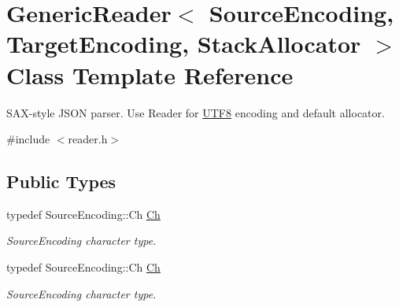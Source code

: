 \hypertarget{classGenericReader}{}\section{Generic\+Reader$<$ Source\+Encoding, Target\+Encoding, Stack\+Allocator $>$ Class Template Reference}
\label{classGenericReader}


S\+A\+X-\/style J\+S\+ON parser. Use Reader for \hyperlink{structUTF8}{U\+T\+F8} encoding and default allocator.  




{\ttfamily \#include $<$reader.\+h$>$}

\subsection*{Public Types}
\begin{DoxyCompactItemize}
\item 
\mbox{\label{classGenericReader_ab39a92bb26d50aee6469df604622218a}} 
typedef Source\+Encoding\+::\+Ch \hyperlink{classGenericReader_ab39a92bb26d50aee6469df604622218a}{Ch}
\begin{DoxyCompactList}\small\item\em Source\+Encoding character type. \end{DoxyCompactList}\item 
\mbox{\label{classGenericReader_ab39a92bb26d50aee6469df604622218a}} 
typedef Source\+Encoding\+::\+Ch \hyperlink{classGenericReader_ab39a92bb26d50aee6469df604622218a}{Ch}
\begin{DoxyCompactList}\small\item\em Source\+Encoding character type. \end{DoxyCompactList}\end{DoxyCompactItemize}
